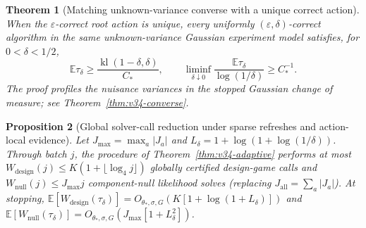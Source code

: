 \documentclass{article}
\theoremstyle{plain}
\newtheorem{theorem}{Theorem}[section]
\newtheorem{proposition}[theorem]{Proposition}
\theoremstyle{definition}
\DeclareMathOperator{\kl}{kl}
\begin{document}
\begin{theorem}[Matching unknown-variance converse with a unique correct action]
\label{thm:v34-converse-main}
When the $\varepsilon$-correct root action is unique, every uniformly
$(\varepsilon,\delta)$-correct algorithm in the same unknown-variance
Gaussian experiment model satisfies, for $0<\delta<1/2$,
\begin{equation}
 \mathbb E\tau_\delta\ge\frac{\kl(1-\delta,\delta)}{C_*},\qquad
 \liminf_{\delta\downarrow0}\frac{\mathbb E\tau_\delta}{\log(1/\delta)}\ge C_*^{-1}.
 \label{eq:v34-unique-main}
\end{equation}
The proof profiles the nuisance variances in the stopped Gaussian
change of measure; see Theorem~\ref{thm:v34-converse}.
\end{theorem}

\begin{proposition}[Global solver-call reduction under sparse refreshes and action-local evidence]
\label{prop:v34-work}
Let $J_{\max}=\max_a|J_a|$ and $L_\delta=1+\log(1+\log(1/\delta))$. Through batch $j$, the procedure of Theorem~\ref{thm:v34-adaptive} performs at most $W_{\mathrm{design}}(j)\le K(1+\lfloor\log_4 j\rfloor)$ globally certified design-game calls and $W_{\mathrm{null}}(j)\le J_{\max}j$ component-null likelihood solves (replacing $J_{\mathrm{all}}=\sum_a|J_a|$). At stopping, $\mathbb E[W_{\mathrm{design}}(\tau_\delta)]=O_{\theta_*,\sigma,G}(K[1+\log(1+L_\delta)])$ and $\mathbb E[W_{\mathrm{null}}(\tau_\delta)]=O_{\theta_*,\sigma,G}(J_{\max}[1+L_\delta^2])$.
\end{proposition}
\end{document}
